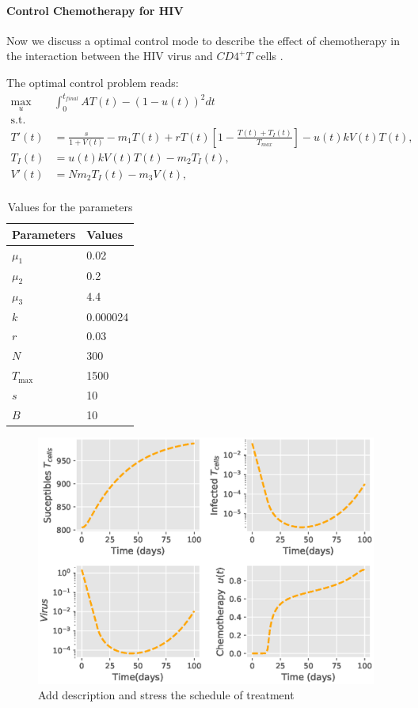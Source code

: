 \paragraph{Control Chemotherapy for HIV} 
	Now we discuss a optimal control mode to describe the effect of chemotherapy
in the interaction between the HIV virus and $CD4^+T$ cells 
\cite{butler1997optimal}.


The optimal control problem reads:
\begin{equation}
	\begin{aligned}
		\max_{u} & \int_{0}^{t_{final}}
			A  T(t) - (1-u(t)) ^ 2 dt
		\\
		\text{s.t. }
		\\
			T'(t) &=
				\frac{s}{1 + V(t)}
				- m_1 T(t) 
				+ r T(t)
				\left[
					1 - \frac{T(t)+ T_{I}(t)}{T_{max}}
				\right] 
				- u(t) k V(t) T(t),
			\\
			T_{I}(t) &=
				u(t) k V(t) T(t) - m_2 T_{I}(t),
			\\
			V'(t) &= N m_2 T_{I}(t) - m_3 V(t),
			\\
	\end{aligned}
\end{equation}


\begin{table}
	\centering
	\begin{tabular}{ll}
		\toprule
			\textbf{Parameters} & \textbf{Values}
            \\
        \midrule
            $\mu_1$ & 0.02
            \\
        	$\mu_2$ & 0.2
			\\
            $\mu_3$ & 4.4
            \\
     	    $k$ & 0.000024
 			\\
     	    $r$ & 0.03
     	    \\
     	    $N$ & 300
            \\
     	    $T_{\text{max}}$ & 1500
     	    \\
     	    $s$ & 10
			\\
     	    $B$ & 10
     	    \\
		\bottomrule
    \end{tabular}
	\caption{Values for the parameters}
\end{table}






\begin{figure}[tbh]
\centering
	\includegraphics[width=0.7\linewidth]{Figures/hiv_chemotherapy_fig_01}
	\caption{Add description and stress the schedule of treatment}
	\label{fig:hivchemotherapyfig01}
\end{figure}
